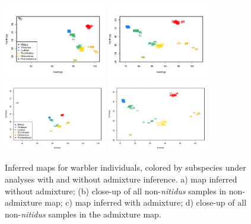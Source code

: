 \documentclass[10pt,letterpaper]{article}
\begin{document}
\begin{figure}
	\centering
			{\includegraphics[width=0.4\textwidth]{../figs/warblers/warb_ind_noad.pdf}}
			{\includegraphics[width=0.4\textwidth]{../figs/warblers/warb_ind_noad_closeup.pdf}}
			{\includegraphics[width=0.4\textwidth]{../figs/warblers/individual_warbler_map_arrows_randpr1.pdf}}
			{\includegraphics[width=0.4\textwidth]{../figs/warblers/individual_warbler_map_arrows_randpr1_closeup.pdf}}
	\caption{
    Inferred maps for warbler individuals, colored by subspecies under analyses with and without admixture inference. a) map inferred without admixture; (b) close-up of all non-\textit{nitidus} samples in non-admixture map; c) map inferred with admixture; d) close-up of all non-\textit{nitidus} samples in the admixture map.}\label{sfig:warbler_ind_maps_compare}
\end{figure}
\end{document}
